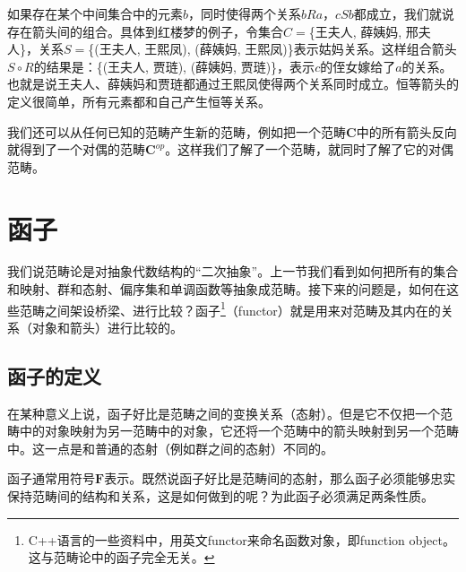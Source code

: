 \documentclass{article}
\begin{document}
如果存在某个中间集合中的元素$b$，同时使得两个关系$bRa$，$cSb$都成立，我们就说存在箭头间的组合。具体到红楼梦的例子，令集合$C=$\{王夫人, 薛姨妈, 邢夫人\}，关系$S=$\{(王夫人, 王熙凤), (薛姨妈, 王熙凤)\}表示姑妈关系。这样组合箭头$S \circ R$的结果是：\{(王夫人, 贾琏), (薛姨妈, 贾琏)\}，表示$c$的侄女嫁给了$a$的关系。也就是说王夫人、薛姨妈和贾琏都通过王熙凤使得两个关系同时成立。恒等箭头的定义很简单，所有元素都和自己产生恒等关系。

我们还可以从任何已知的范畴产生新的范畴，例如把一个范畴$\pmb{C}$中的所有箭头反向就得到了一个对偶的范畴$\pmb{C}^{op}$。这样我们了解了一个范畴，就同时了解了它的对偶范畴。

\section{函子}
我们说范畴论是对抽象代数结构的“二次抽象”。上一节我们看到如何把所有的集合和映射、群和态射、偏序集和单调函数等抽象成范畴。接下来的问题是，如何在这些范畴之间架设桥梁、进行比较？函子\footnote{C++语言的一些资料中，用英文functor来命名函数对象，即function object。这与范畴论中的函子完全无关。}（functor）就是用来对范畴及其内在的关系（对象和箭头）进行比较的。

\subsection{函子的定义}
在某种意义上说，函子好比是范畴之间的变换关系（态射）。但是它不仅把一个范畴中的对象映射为另一范畴中的对象，它还将一个范畴中的箭头映射到另一个范畴中。这一点是和普通的态射（例如群之间的态射）不同的。

函子通常用符号$\mathbf{F}$表示。既然说函子好比是范畴间的态射，那么函子必须能够忠实保持范畴间的结构和关系，这是如何做到的呢？为此函子必须满足两条性质。
\end{document}
